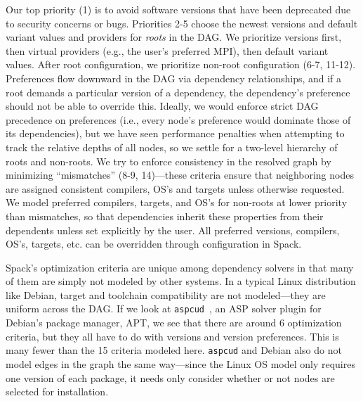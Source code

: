 Our top priority (1) is to avoid software versions that have been deprecated due to
security concerns or bugs. Priorities 2-5 choose the newest versions and default variant
values and providers for {\it roots} in the DAG. We prioritize versions first, then
virtual providers (e.g., the user's preferred MPI), then default variant values. After
root configuration, we prioritize non-root configuration (6-7, 11-12). Preferences flow
downward in the DAG via dependency relationships, and if a root demands a particular
version of a dependency, the dependency's preference should not be able to override
this. Ideally, we would enforce strict DAG precedence on preferences (i.e., every node's
preference would dominate those of its dependencies), but we have seen performance
penalties when attempting to track the relative depths of all nodes, so we settle for a
two-level hierarchy of roots and non-roots. We try to enforce consistency in the
resolved graph by minimizing ``mismatches'' (8-9, 14)---these criteria ensure that
neighboring nodes are assigned consistent compilers, OS's and targets unless otherwise
requested. We model preferred compilers, targets, and OS's for non-roots at lower
priority than mismatches, so that dependencies inherit these properties from their
dependents unless set explicitly by the user. All preferred versions, compilers, OS's,
targets, etc. can be overridden through configuration in Spack.

Spack's optimization criteria are unique among dependency solvers in that many of them
are simply not modeled by other systems. In a typical Linux distribution like Debian,
target and toolchain compatibility are not modeled---they are uniform across the DAG. If
we look at {\tt aspcud}~\cite{gebser+:2011-aspcud}, an ASP solver plugin for Debian's
package manager, APT, we see that there are around 6 optimization criteria, but they all
have to do with versions and version preferences. This is many fewer than the 15
criteria modeled here. {\tt aspcud} and Debian also do not model edges in the graph the
same way---since the Linux OS model only requires one version of each package, it needs
only consider whether or not nodes are selected for installation.
